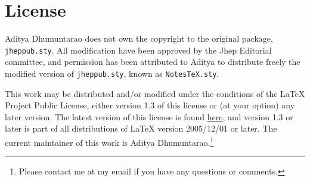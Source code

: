 \section{License}\label{sec:license}
Aditya Dhumuntarao does not own the copyright to the original package, \texttt{jheppub.sty}. All modification have been approved by the Jhep Editorial committee, and permission has been attributed to Aditya to distribute freely the modified version of \texttt{jheppub.sty}, known as \texttt{NotesTeX.sty}.

This work may be distributed and/or modified under the conditions of the LaTeX Project Public License, either version 1.3 of this license or (at your option) any later version. The latest version of this license is found \href{http://www.latex-project.org/lppl.txt}{here}, and version 1.3 or later is part of all distributions of LaTeX version 2005/12/01 or later. The current maintainer of this work is Aditya Dhumuntarao.\footnote{Please contact me at my email if you have any questions or comments.}

\newpage